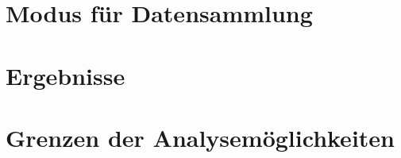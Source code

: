 \section{Modus für Datensammlung}
\label{sec:benchmarks}


\section{Ergebnisse}
\label{sec:results}


\section{Grenzen der Analysemöglichkeiten}

